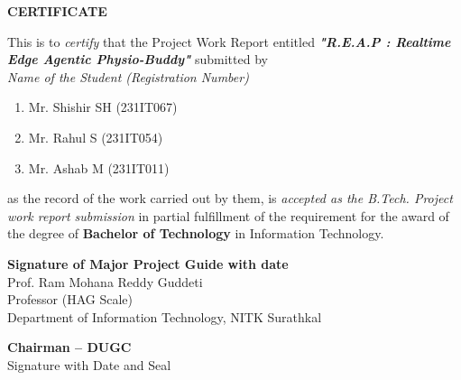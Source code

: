 \documentclass[12pt]{report}
\begin{document}
\begin{framed}
    \begin{center}
        \textbf{{\Large CERTIFICATE}}
    \end{center}
    \vspace{0.6em}
    This is to \textit{certify} that the Project Work Report entitled \textit{\textbf{"R.E.A.P : Realtime Edge Agentic Physio-Buddy"}} submitted by \\
    \vspace{0.3em}
    \textit{Name of the Student (Registration Number)}
    \begin{enumerate}[label={(\arabic*)}]
        \setlength{\itemsep}{0.2em}
        \item Mr. Shishir SH (231IT067)
        \item Mr. Rahul S (231IT054)
        \item Mr. Ashab M (231IT011)
    \end{enumerate}
    as the record of the work carried out by them, is \textit{accepted as the B.Tech. Project work report submission} in partial fulfillment of the requirement for the award of the degree of \textbf{Bachelor of Technology} in Information Technology.
    \vspace{1.5em}

    \noindent\begin{minipage}{\linewidth}
        \centering
        \textbf{Signature of Major Project Guide with date}\\[0.2em]
        Prof. Ram Mohana Reddy Guddeti\\
        Professor (HAG Scale) \\
        Department of Information Technology, NITK Surathkal
    \end{minipage}
    \vspace{1.8em}

    \noindent\begin{minipage}{\linewidth}
        \centering
        \textbf{Chairman -- DUGC}\\[0.2em]
        {Signature with Date and Seal}
    \end{minipage}
    \vspace{1.2em}
\end{framed}
\thispagestyle{empty}
\clearpage
\end{document}
